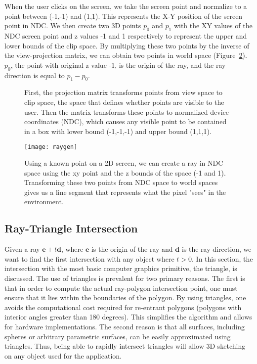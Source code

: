 When the user clicks on the screen, we take the screen point and normalize to a point between (-1,-1) and (1,1).
This represents the X-Y position of the screen point in NDC.
We then create two 3D points $p_0$ and $p_1$ with the XY values of the NDC screen point and z values -1 and 1 respectively to represent the upper and lower bounds of the clip space.
By multiplying these two points by the inverse of the view-projection matrix, we can obtain two points in world space (Figure~\ref{fig:raygen}). 
$p_0$, the point with original z value -1, is the origin of the ray, and the ray direction is equal to $p_1 - p_0$.

\begin{figure}
\label{fig:projmatrix}
\caption[Clip space and NDC space]{First, the projection matrix transforms points from view space to clip space, the space that defines whether points are visible to the user. Then the matrix transforms these points to normalized device coordinates (NDC), which causes any visible point to be contained in a box with lower bound (-1,-1,-1) and upper bound (1,1,1).}
\end{figure}

\begin{figure}
\label{fig:raygen}
\texttt{[image: raygen]}
\caption[Generating the Ray]{Using a known point on a 2D screen, we can create a ray in NDC space using the xy point and the z bounds of the space (-1 and 1). Transforming these two points from NDC space to world spaces gives us a line segment that represents what the pixel "sees" in the environment.}

\end{figure}


\subsection{Ray-Triangle Intersection}

Given a ray $\mathbf{e} + t\mathbf{d}$, where $\mathbf{e}$ is the origin of the ray and $\mathbf{d}$ is the ray direction, we want to find the first intersection with any object where $t > 0$.
In this section, the intersection with the most basic computer graphics primitive, the triangle, is discussed.
The use of triangles is prevalent for two primary reasons.
The first is that in order to compute the actual ray-polygon intersection point, one must ensure that it lies within the boundaries of the polygon.
By using triangles, one avoids the computational cost required for re-entrant polygons (polygons with interior angles greater than 180 degrees).
This simplifies the algorithm and allows for hardware implementations.
The second reason is that all surfaces, including spheres or arbitrary parametric surfaces, can be easily approximated using triangles.
Thus, being able to rapidly intersect triangles will allow 3D sketching on any object used for the application.

